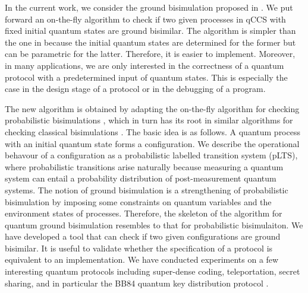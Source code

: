 \documentclass[a4paper,UKenglish,cleveref, autoref]{lipics-v2019}
\begin{document}
In the current work, we consider the ground bisimulation proposed in \cite{DF12}. We put forward an on-the-fly algorithm to check if two given processes in qCCS with fixed initial quantum states are ground bisimilar. The algorithm is simpler than the one in \cite{FDY14} because the initial quantum states are determined for the former but can be parametric for the latter. Therefore, it is easier to implement. Moreover, in many applications, we are only interested in the correctness of a quantum protocol with a predetermined input of quantum states. This is especially the case in the design stage of a protocol or in the debugging of a program. 

The new algorithm is obtained by adapting the on-the-fly algorithm for checking probabilistic bisimulations \cite{Deng15}, which in turn has its root in similar algorithms
for checking classical bisimulations \cite{FM90,HL95}. The basic idea is as follows. A quantum process with an initial quantum state forms a configuration. We describe the operational behavour of a configuration as a probabilistic labelled transition system (pLTS), where probabilistic transitions arise naturally because measuring a quantum system can entail a probability distribution of post-measurement quantum systems. The notion of ground bisimulation is a strengthening of probabilistic bisimulation by imposing some constraints on quantum variables and the environment states of processes. Therefore, the skeleton of the algorithm for quantum ground bisimulation resembles to that for probabilistic bisimulaiton.
We have developed a tool that can check if two given configurations are ground bisimilar. It is useful to validate whether the specification of a protocol is equivalent to an implementation. We have conducted experiments on a few interesting quantum protocols including super-dense coding, teleportation, secret sharing, and in particular the BB84 quantum key distribution protocol \cite{BB84}.
\end{document}
